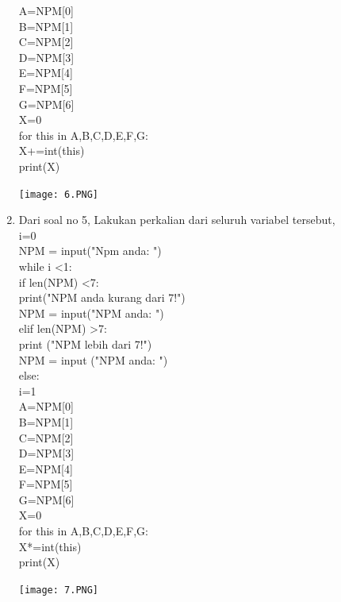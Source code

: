 \documentclass{article}
\begin{document}
\begin{enumerate}
A=NPM[0]\\
B=NPM[1]\\
C=NPM[2]\\
D=NPM[3]\\
E=NPM[4]\\
F=NPM[5]\\
G=NPM[6]\\

X=0\\

for this in A,B,C,D,E,F,G:\\
    X+=int(this)\\
print(X)\\
\begin{center}
    \texttt{[image: 6.PNG]}
\end{center}

\item Dari soal no 5, Lakukan perkalian dari seluruh variabel tersebut,\\
i=0\\
NPM = input("Npm anda: ")\\
while i <1:\\
    if len(NPM) <7:\\
        print("NPM anda kurang dari 7!")\\
        NPM = input("NPM anda: ")\\
    elif len(NPM) >7:\\
        print ("NPM lebih dari 7!")\\
        NPM = input ("NPM anda: ")\\
    else:\\
        i=1\\

A=NPM[0]\\
B=NPM[1]\\
C=NPM[2]\\
D=NPM[3]\\
E=NPM[4]\\
F=NPM[5]\\
G=NPM[6]\\

X=0\\

for this in A,B,C,D,E,F,G:\\
    X*=int(this)\\
print(X)\\
\begin{center}
    \texttt{[image: 7.PNG]}
\end{center}


\end{enumerate}
\end{document}
